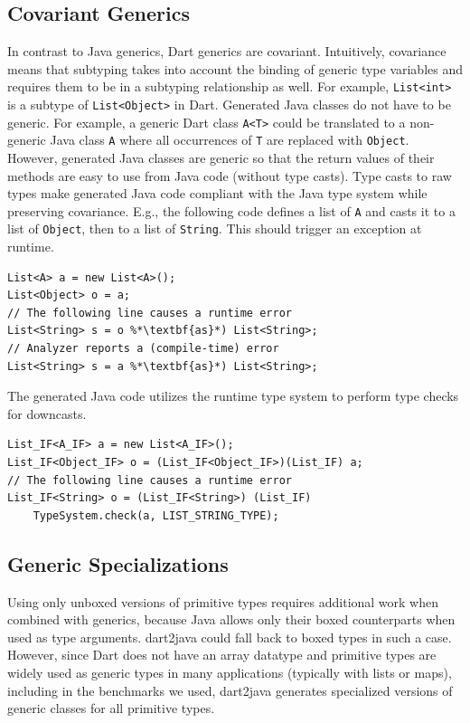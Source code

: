 \documentclass[sigplan]{acmart}
\begin{document}
\subsection{Covariant Generics}
In contrast to Java generics, Dart generics are covariant. Intuitively, covariance~\cite{Castagna:1995:CCC:203095.203096} means that subtyping takes into account the binding of generic type variables and requires them to be in a subtyping relationship as well. For example, \texttt{List<int>} is a subtype of \texttt{List<Object>} in Dart. Generated Java classes do not have to be generic. For example, a generic Dart class \texttt{A<T>} could be translated to a non-generic Java class \texttt{A} where all occurrences of \texttt{T} are replaced with \texttt{Object}. However, generated Java classes are generic so that the return values of their methods are easy to use from Java code (without type casts). Type casts to raw types make generated Java code compliant with the Java type system while preserving covariance. E.g., the following code defines a list of \texttt{A} and casts it to a list of \texttt{Object}, then to a list of \texttt{String}. This should trigger an exception at runtime.
\begin{mdframed}[outerlinewidth=0.1pt,outerlinecolor=black,skipabove=4pt,
  innerleftmargin=5pt,innerrightmargin=0pt,innertopmargin=0pt,innerbottommargin=0pt]
\begin{lstlisting}
List<A> a = new List<A>();
List<Object> o = a;
// The following line causes a runtime error
List<String> s = o %*\textbf{as}*) List<String>;
// Analyzer reports a (compile-time) error
List<String> s = a %*\textbf{as}*) List<String>;
\end{lstlisting}
\end{mdframed}
The generated Java code utilizes the runtime type system to perform type checks for downcasts.
\begin{mdframed}[outerlinewidth=0.1pt,outerlinecolor=black,skipabove=4pt,
  innerleftmargin=5pt,innerrightmargin=0pt,innertopmargin=0pt,innerbottommargin=0pt]
\begin{lstlisting}
List_IF<A_IF> a = new List<A_IF>();
List_IF<Object_IF> o = (List_IF<Object_IF>)(List_IF) a;
// The following line causes a runtime error
List_IF<String> o = (List_IF<String>) (List_IF) 
    TypeSystem.check(a, LIST_STRING_TYPE);
\end{lstlisting}
\end{mdframed}

\subsection{Generic Specializations}
\label{sec:generic_spec}
Using only unboxed versions of primitive types requires additional work when combined with generics, because Java allows only their boxed counterparts when used as type arguments. dart2java could fall back to boxed types in such a case. However, since Dart does not have an array datatype and primitive types are widely used as generic types in many applications (typically with lists or maps), including in the benchmarks we used, dart2java generates specialized versions of generic classes for all primitive types.
\end{document}
